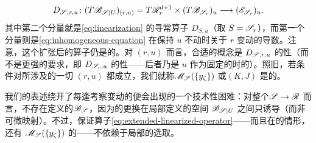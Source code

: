 \begin{equation}\label{eq:extended-linearized-operator}
D_{\mathscr{S},r,u}\colon (T\mathscr{B}_{\mathscr{S}|U})_{(r,u)}
=T\mathscr{R}^{d+1}_r\times(T\mathscr{B}_{\mathscr{S}_r})_u
\longrightarrow(\mathscr{E}_{\mathscr{S}_r})_u.
\end{equation}
其中第二个分量就是\eqref{eq:linearization} 的寻常\trLinearization{}算子 $D_{S,u}$（取 $S=\mathscr{S}_r$），而第一个分量则是\eqref{eq:inhomogeneous-equation} 在保持 $u$ 不动时关于 $r$ 变动的导数。注意，这个扩张后的算子仍是\trFredholm{}的。对 $(r,u)$ 而言，合适的\trRegularity{}概念是 $D_{\mathscr{S},r,u}$ 的\trSurjective{}性（而不是更强的要求，即 $D_{\mathscr{S}_r,u}$ 的\trSurjective{}性——后者乃是 $u$ 作为\trDomain{}固定的\trInhomogeneous\trPseudoholomorphicMap{}时的\trRegularity）。照旧，若\trRegularity{}条件对所涉及的一切 $(r,u)$ 都成立，我们就称\trModuliSpace{}$\mathscr{M}_{\mathscr{S}}(\{y_\zeta\})$ 或\trPerturbationDatum{}$(K,J)$ 是\trRegular{}的。
\begin{remark}\label{thm:trivialization-independence}
我们的表述绕开了每逢考察\trDomain{}变动的\trPseudoholomorphicMap{}便会出现的一个技术性困难：对整个\trFamily{}$\mathscr{S}\to\mathscr{R}$ 而言，不存在\trCanonical{}定义的\trBanachManifold{}$\mathscr{B}_{\mathscr{S}}$，因为\trTrivialization{}的更换在局部定义的空间 $\mathscr{B}_{\mathscr{S}|U}$ 之间只诱导\trBanach\trHomeomorphism（而非可微映射）。不过，\trEllipticRegularity{}保证算子\eqref{eq:extended-linearized-operator}——而且在\trRegular{}的情形，还有 $\mathscr{M}_{\mathscr{S}}(\{y_\zeta\})$ 的\trSmoothStructure——不依赖于局部\trTrivialization{}的选取。
\end{remark}
